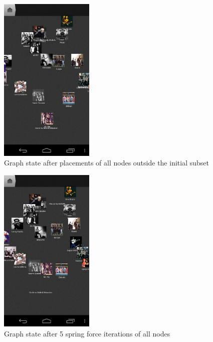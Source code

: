 \begin{figure}[H]
  \centering
    \includegraphics[width=0.4\textwidth]{figures/screen_mds_5_after_all_restnode_additions}
  \caption{Graph state after placements of all nodes outside the initial subset}
\end{figure}

\begin{figure}[H]
  \centering
    \includegraphics[width=0.4\textwidth]{figures/screen_mds_6_after_5_cleanup_iterations}
  \caption{Graph state after 5 spring force iterations of all nodes}
\end{figure}


